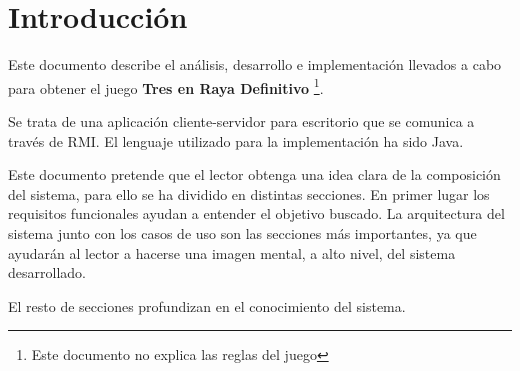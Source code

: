 \documentclass[a4paper,11pt,oneside]{article}
\begin{document}

\setcounter{page}{1}

\tableofcontents
\clearpage

\setcounter{page}{1}

\clearpage
\section{Introducción}

Este documento describe el análisis, desarrollo e implementación llevados a cabo para obtener
el juego \textbf{Tres en Raya Definitivo} \footnote{Este documento no explica las reglas del juego}.

Se trata de una aplicación cliente-servidor para escritorio que se comunica a través de RMI.
El lenguaje utilizado para la implementación ha sido Java.

Este documento pretende que el lector obtenga una idea clara de la composición del sistema, para ello
se ha dividido en distintas secciones. En primer lugar los requisitos funcionales ayudan a entender el objetivo
buscado. La arquitectura del sistema junto con los casos de uso son las secciones más importantes, ya
que ayudarán al lector a hacerse una imagen mental, a alto nivel, del sistema desarrollado.

El resto de secciones profundizan en el conocimiento del sistema.

\clearpage


\clearpage


\clearpage


\clearpage


\clearpage


\clearpage


\clearpage


\clearpage
\end{document}
